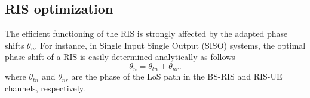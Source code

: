\documentclass[conference]{IEEEtran}
\begin{document}
%





\subsection{RIS optimization}
The efficient functioning of the RIS is strongly affected by the adapted phase shifts $\theta_n$. For instance, in Single Input Single Output (SISO)  systems, the optimal phase shift of a RIS is  easily determined analytically as follows \cite{alfattani2021link}
\begin{equation}\label{eq:angle_opt}
\theta_n=\theta_{tn}+\theta_{nr}. 
\end{equation} where $\theta_{tn}$ and 
$\theta_{nr}$ are the phase of the LoS path in the BS-RIS
and RIS-UE channels, respectively.
\end{document}
